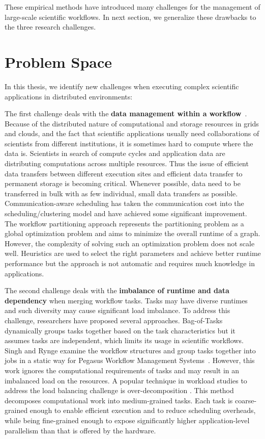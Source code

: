 These empirical methods have introduced many challenges for the management of large-scale scientific workflows. In next section, we generalize these drawbacks to the three research challenges. 

\section{Problem Space}

In this thesis, we identify new challenges when executing complex scientific applications in distributed environments:

The first challenge deals with the \textbf{data management within a workflow}~\cite{wang2013supporting, wang2012scimate, wang2014removing}. 
Because of the distributed nature of computational and storage resources in grids and clouds, and the fact that scientific applications usually need collaborations of scientists from different institutions, it is sometimes hard to compute where the data is. Scientists in search of compute cycles and application data are distributing computations across multiple resources. 
Thus the issue of efficient data transfers between different execution sites and efficient data transfer to permanent storage is becoming critical. Whenever possible, data need to be transferred in bulk with as few individual, small data transfers as possible. 
Communication-aware scheduling \cite{Sonmez2006, Jones2004} has taken the communication cost into the scheduling/clustering model and have achieved some significant improvement. The workflow partitioning approach \cite{Hedayat2009, Yuan2010, Wieczorek2005,Rubing2005} represents the partitioning problem as a global optimization problem and aims to minimize the overall runtime of a graph. However, the complexity of solving such an optimization problem does not scale well. Heuristics \cite{Maheshwari2012, Callaghan2010} are used to select the right parameters and achieve better runtime performance but the approach is not automatic and requires much knowledge in applications. 


The second challenge deals with the \textbf{imbalance of runtime and data dependency} when merging workflow tasks. Tasks may have diverse runtimes and such diversity may cause significant load imbalance. To address this challenge, researchers have proposed several approaches. Bag-of-Tasks \cite{Hussin2010, Celaya2010, Oprescu2010} dynamically groups tasks together based on the task characteristics but it assumes tasks are independent, which limits its usage in scientific workflows. Singh \cite{Singh2008} and Rynge \cite{Rynge2012} examine the workflow structures and group tasks together into jobs in a static way for Pegasus Workflow Management Systems~\cite{Deelman2004}.
However, this work ignores the computational requirements of tasks and may result in an imbalanced load on the resources. A popular technique in workload studies to address the load balancing challenge is over-decomposition \cite{Lifflander2012}. This method decomposes computational work into medium-grained tasks. Each task is coarse-grained enough to enable efficient execution and to reduce scheduling overheads, while being fine-grained enough to expose significantly higher application-level parallelism than that is offered by the hardware. 


